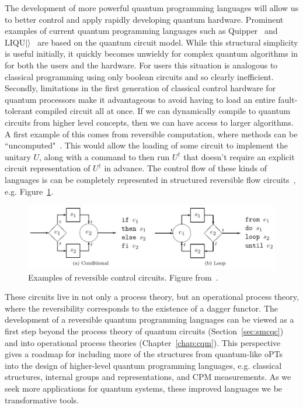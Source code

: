 The development of more powerful quantum programming languages will allow us to better control and apply rapidly developing quantum hardware. Prominent examples of current quantum programming languages such as Quipper~\cite{green2013quipper} and LIQU$|\rangle$~\cite{wecker2014liqui} are based on the quantum circuit model. While this structural simplicity is useful initially, it quickly becomes unwieldy for complex quantum algorithms in for both the users and the hardware. For users this situation is analogous to classical programming using only boolean circuits and so clearly inefficient. Secondly, limitations in the first generation of classical control hardware for quantum processors make it advantageous to avoid having to load an entire fault-tolerant compiled circuit all at once. If we can dynamically compile to quantum circuits from higher level concepts, then we can have access to larger algorithms. A first example of this comes from reversible computation, where methods can be ``uncomputed"~\cite{yokoyama2008principles}. This would allow the loading of some circuit to implement the unitary $U$, along with a command to then run $U^{\dagger}$ that doesn't require an explicit circuit representation of $U^{\dagger}$ in advance. The control flow of these kinds of languages is can be completely represented in structured reversible flow circuits~\cite{yokoyama2008reversible}, e.g. Figure~\ref{fig:reversible}.

\begin{figure}[ht]
\centering
\includegraphics[scale=0.45]{figures/reversible.eps}
\caption[Example of reversible control ciruits.]{Examples of reversible control circuits.  Figure from~\cite{yokoyama2010reversible}.}
\label{fig:reversible}
\end{figure}

These circuits live in not only a process theory, but an operational process theory, where the reversibility corresponds to the existence of a dagger functor. The development of a reversible quantum programming languages can be viewed as a first step beyond the process theory of quantum circuits (Section~\ref{sec:smcqc}) and into operational process theories (Chapter~\ref{chap:cqm}). This perspective gives a roadmap for including more of the structures from quantum-like oPTs into the design of higher-level quantum programming languages, e.g. classical structures, internal groups and representations, and CPM measurements. As we seek more applications for quantum systems, these improved languages we be transformative tools.
